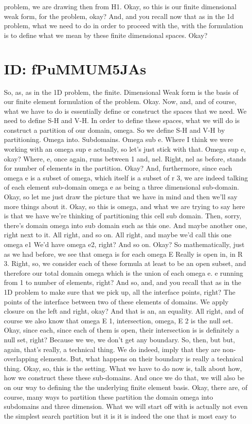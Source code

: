 \documentclass[10pt]{article}
\begin{document}
problem, we are drawing then from H1. Okay, so this is our finite dimensional weak form, for the problem, okay? And, and you recall now that as in the 1d problem, what we need to do in order to proceed with the, with the formulation is to define what we mean by these finite dimensional spaces. Okay?

\section*{ID: fPuMMUM5JAs}
So, as, as in the 1D problem, the finite. Dimensional Weak form is the basis of our finite element formulation of the problem. Okay. Now, and, and of course, what we have to do is essentially define or construct the spaces that we need. We need to define S-H and V-H. In order to define these spaces, what we will do is construct a partition of our domain, omega. So we define S-H and V-H by partitioning. Omega into. Subdomains. Omega sub e. Where I think we were working with an omega sup e actually, so let's just stick with that. Omega sup e, okay? Where, e, once again, runs between 1 and, nel. Right, nel as before, stands for number of elements in the partition. Okay? And, furthermore, since each omega e is a subset of omega, which itself is a subset of r 3, we are indeed talking of each element sub-domain omega e as being a three dimensional sub-domain. Okay, so let me just draw the picture that we have in mind and then we'll say more things about it. Okay, so this is omega, and what we are trying to say here is that we have we're thinking of partitioning this cell sub domain. Then, sorry, there's domain omega into sub domain such as this one. And maybe another one, right next to it. All right, and so on. All right, and maybe we'd call this one omega e1 We'd have omega e2, right? And so on. Okay? So mathematically, just as we had before, we see that omega is for each omega E Really is open in, in R 3. Right, so, we consider each of these formula at least to be an open subset, and therefore our total domain omega which is the union of each omega e. e running from 1 to number of elements, right? And so, and, and you recall that as in the 1D problem to make sure that we pick up, all the interface points, right? The points of the interface between two of these elements of domains. We apply closure on the left and right, okay? And that is an, an equality. All right, and of course we also know that omega E 1, intersection, omega, E 2 is the null set. Okay, since each, since each of them is open, their intersection is is definitely a null set, right? Because we we, we don't get any boundary. So, then, but but, again, that's really, a technical thing. We do indeed, imply that they are non-overlapping elements. But, what happens on their boundary is really a technical thing. Okay, so, this is the setting. What we have to do now is, talk about how, how we construct these these sub-domains. And once we do that, we will also be on our way to defining the the underlying finite element basis. Okay, there are, of course, many ways to partition these partition the domain omega into subdomains and three dimension. What we will start off with is actually not even the simplest search partition but it is it is indeed the one that is most easy to 
\end{document}

